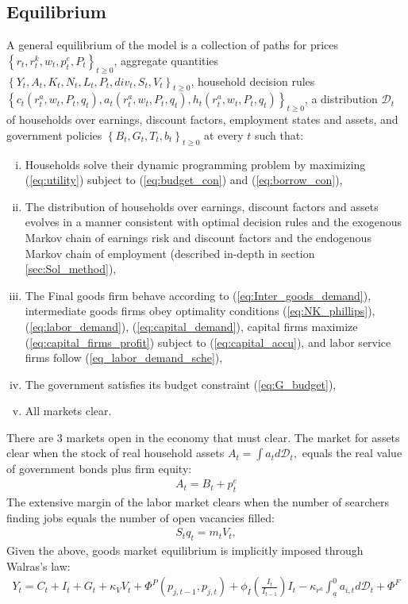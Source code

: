 \subsection{Equilibrium}
A general equilibrium of the model is a collection of paths for prices $\left\{ r_{t},r_{t}^{k},w_{t},p_{t}^{e},P_{t}\right\} _{t\geq0}$, aggregate quantities $\left\{ Y_{t},A_{t},K_{t},N_{t},L_{t},P_{t},div_{t},S_{t},V_{t}\right\} _{t\geq0}$, household decision rules \\ $\left\{ c_{t}\left(r_{t}^{a},w_{t},P_{t},q_{t}\right),a_{t}\left(r_{t}^{a},w_{t},P_{t},q_{t}\right),h_{t}\left(r_{t}^{a},w_{t},P_{t},q_{t}\right)\right\} _{t\geq0}$, a distribution $\mathcal{D}_{t}$ of households over earnings, discount factors, employment states and assets, and government policies $\left\{ B_{t},G_{t},T_{t},b_{t}\right\}_{t\geq0}$ at every $t$ such that:
\begin{enumerate}[(i)]
\itemsep0em 
  \item Households solve their dynamic programming problem by maximizing (\ref{eq:utility}) subject to (\ref{eq:budget_con}) and (\ref{eq:borrow_con}),
  \item The distribution of households over earnings, discount factors and assets evolves in a manner consistent with optimal decision rules and the exogenous Markov chain of earnings risk and discount factors and the endogenous Markov chain of employment (described in-depth in section \ref{sec:Sol_method}),  
  \item The Final goods firm behave according to (\ref{eq:Inter_goods_demand}), intermediate goods firms obey optimality conditions (\ref{eq:NK_phillips}), (\ref{eq:labor_demand}), (\ref{eq:capital_demand}), capital firms maximize (\ref{eq:capital_firms_profit}) subject to (\ref{eq:capital_accu}), and labor service firms follow (\ref{eq_labor_demand_sche}), 
  \item The government satisfies its budget constraint (\ref{eq:G_budget}), 
  \item All markets clear.
\end{enumerate}
There are 3 markets open in the economy that must clear. The market for assets clear when the stock of real household assets $A_t = \int a_{t}d\mathcal{D}_{t},$ equals the real value of government bonds plus firm equity: 
\begin{gather*}
A_{t} = B_{t} + p_{t}^{e}
\end{gather*}
The extensive margin of the labor market clears when the number of searchers finding jobs equals the number of open vacancies filled:
\begin{gather*}
S_{t}q_{t}=m_{t}V_{t},
\end{gather*}
Given the above, goods market equilibrium is implicitly imposed through Walras's law:
\begin{gather*}
Y_{t}=C_{t}+I_{t}+G_{t}+\kappa_{V}V_{t}+\Phi^{P}\left(p_{j,t-1},p_{j,t}\right)+\phi_{I}\left(\frac{I_{t}}{I_{t-1}}\right)I_{t}-\kappa_{r^{a}}\int_{\underline{a}}^{0}a_{i,t}d\mathcal{D}_{t}+\Phi^{F}
\end{gather*}

